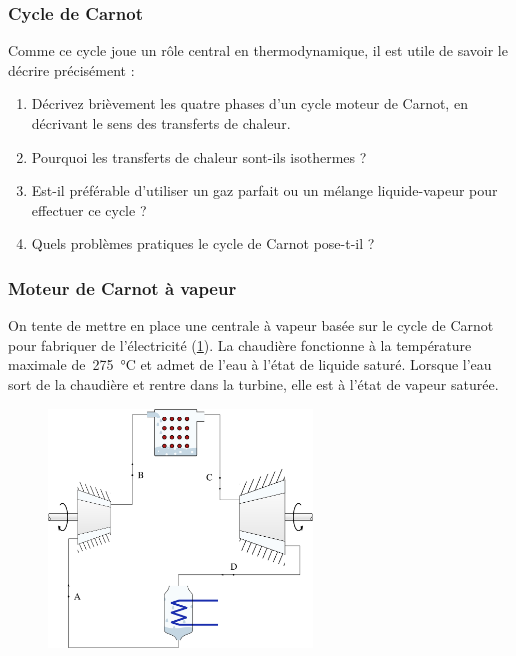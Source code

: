 \subsubsection{Cycle de Carnot}
\label{exo_cours_carnot}

	Comme ce cycle joue un rôle central en thermodynamique, il est utile de savoir le décrire précisément :
	
	\begin{enumerate}
	
		\item Décrivez brièvement les quatre phases d’un cycle moteur de Carnot, en décrivant le sens des transferts de chaleur.
	
		\item Pourquoi les transferts de chaleur sont-ils isothermes ?
		
		\item Est-il préférable d’utiliser un gaz parfait ou un mélange liquide-vapeur pour effectuer ce cycle ?
		
		\item Quels problèmes pratiques le cycle de Carnot pose-t-il ?

	\end{enumerate}


\subsubsection{Moteur de Carnot à vapeur}
\label{exo_moteur_carnot_vapeur}

	On tente de mettre en place une centrale à vapeur basée sur le cycle de Carnot pour fabriquer de l’électricité (\cref{fig_exo_carnot_circuit_vapeur}). La chaudière fonctionne à la température maximale de~\SI{275}{\degreeCelsius} et admet de l’eau à l’état de liquide saturé. Lorsque l’eau sort de la chaudière et rentre dans la turbine, elle est à l’état de vapeur saturée.

	\begin{figure}[hc]%
		\begin{center}
			\includegraphics[width=7cm]{images/circuit_carnot_vapeur.png}
		\end{center}
		\label{fig_exo_carnot_circuit_vapeur}
	\end{figure}
	
